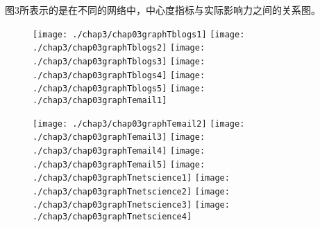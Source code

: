 图3所表示的是在不同的网络中，中心度指标与实际影响力之间的关系图。
\begin{figure}[H]
	\centering%
	\subcaptionbox{\label{fig:chap03graphTblogs1}}
	{\texttt{[image: ./chap3/chap03graphTblogs1]}}
	\subcaptionbox{\label{fig:chap03graphTblogs2}}
	{\texttt{[image: ./chap3/chap03graphTblogs2]}}
	\subcaptionbox{\label{fig:chap03graphTblogs3}}
	{\texttt{[image: ./chap3/chap03graphTblogs3]}}
	\subcaptionbox{\label{fig:chap03graphTblogs4}}
	{\texttt{[image: ./chap3/chap03graphTblogs4]}}
	\subcaptionbox{\label{fig:chap03graphTblogs5}}
	{\texttt{[image: ./chap3/chap03graphTblogs5]}}
	\subcaptionbox{\label{fig:chap03graphTemail1}}
	{\texttt{[image: ./chap3/chap03graphTemail1]}}
		
\end{figure}

\addtocounter{figure}{-1}       %
\begin{figure}[H]
	\addtocounter{figure}{1}
	\centering%
	\subcaptionbox{\label{fig:chap03graphTemail2}}
	{\texttt{[image: ./chap3/chap03graphTemail2]}}
	\subcaptionbox{\label{fig:chap03graphTemail3}}
	{\texttt{[image: ./chap3/chap03graphTemail3]}}
	\subcaptionbox{\label{fig:chap03graphTemail4}}
	{\texttt{[image: ./chap3/chap03graphTemail4]}}
	\subcaptionbox{\label{fig:chap03graphTemail5}}
	{\texttt{[image: ./chap3/chap03graphTemail5]}}
	\subcaptionbox{\label{fig:chap03graphTnetscience1}}
	{\texttt{[image: ./chap3/chap03graphTnetscience1]}}
	\subcaptionbox{\label{fig:chap03graphTnetscience2}}
	{\texttt{[image: ./chap3/chap03graphTnetscience2]}}
	\subcaptionbox{\label{fig:chap03graphTnetscience3}}
	{\texttt{[image: ./chap3/chap03graphTnetscience3]}}
	\subcaptionbox{\label{fig:chap03graphTnetscience4}}
	{\texttt{[image: ./chap3/chap03graphTnetscience4]}}	
\end{figure}

